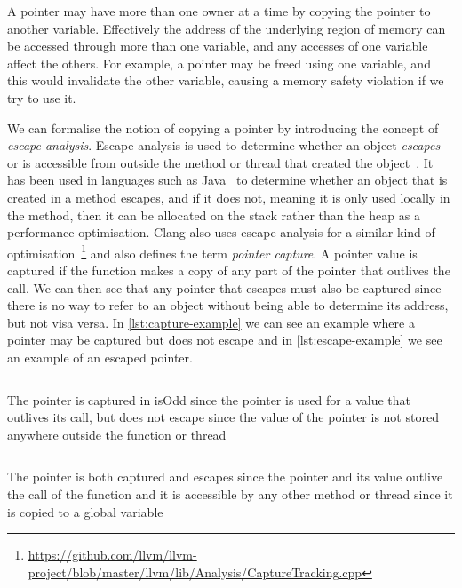\documentclass{proposal}
\begin{document}
    A pointer may have more than one owner at a time by copying the pointer to another variable.
    Effectively the address of the underlying region of memory can be accessed through more than one variable, and any accesses of one variable affect the others.
    For example, a pointer may be freed using one variable, and this would invalidate the other variable, causing a memory safety violation if we try to use it.

    We can formalise the notion of copying a pointer by introducing the concept of \emph{escape analysis}.
    Escape analysis is used to determine whether an object \emph{escapes} or is accessible from outside the method or thread that created the object~\cite{Choi1999}.
    It has been used in languages such as Java~\cite{Choi1999} to determine whether an object that is created in a method escapes, and if it does not, meaning it is only used locally in the method, then it can be allocated on the stack rather than the heap as a performance optimisation.
    Clang also uses escape analysis for a similar kind of optimisation~\footnote{\url{https://github.com/llvm/llvm-project/blob/master/llvm/lib/Analysis/CaptureTracking.cpp}} and also defines the term \emph{pointer capture}.
    A pointer value is captured if the function makes a copy of any part of the pointer that outlives the call.
    We can then see that any pointer that escapes must also be captured since there is no way to refer to an object without being able to determine its address, but not visa versa.
    In \autoref{lst:capture-example} we can see an example where a pointer may be captured but does not escape and in \autoref{lst:escape-example} we see an example of an escaped pointer.

    \begin{listing}
        \inputminted{c++}{code/capture-example.cpp}
        \caption{The pointer is captured in isOdd since the pointer is used for a value that outlives its call, but does not escape since the value of the pointer is not stored anywhere outside the function or thread}
        \label{lst:capture-example}
    \end{listing}

    \begin{listing}
        \inputminted{c++}{code/escape-example.cpp}
        \caption{The pointer is both captured and escapes since the pointer and its value outlive the call of the function and it is accessible by any other method or thread since it is copied to a global variable}
        \label{lst:escape-example}
    \end{listing}
\end{document}
